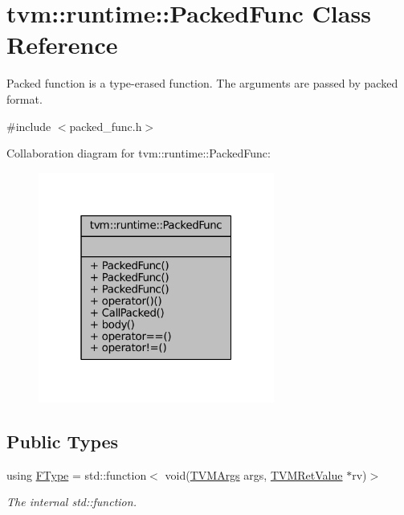 \hypertarget{classtvm_1_1runtime_1_1PackedFunc}{}\section{tvm\+:\+:runtime\+:\+:Packed\+Func Class Reference}
\label{classtvm_1_1runtime_1_1PackedFunc}


Packed function is a type-\/erased function. The arguments are passed by packed format.  




{\ttfamily \#include $<$packed\+\_\+func.\+h$>$}



Collaboration diagram for tvm\+:\+:runtime\+:\+:Packed\+Func\+:
\nopagebreak
\begin{figure}[H]
\begin{center}
\leavevmode
\includegraphics[width=220pt]{classtvm_1_1runtime_1_1PackedFunc__coll__graph}
\end{center}
\end{figure}
\subsection*{Public Types}
\begin{DoxyCompactItemize}
\item 
using \hyperlink{classtvm_1_1runtime_1_1PackedFunc_ae5f951a6a515f3e3a7493c27704b7849}{F\+Type} = std\+::function$<$ void(\hyperlink{classtvm_1_1runtime_1_1TVMArgs}{T\+V\+M\+Args} args, \hyperlink{classtvm_1_1runtime_1_1TVMRetValue}{T\+V\+M\+Ret\+Value} $\ast$rv)$>$
\begin{DoxyCompactList}\small\item\em The internal std\+::function. \end{DoxyCompactList}\end{DoxyCompactItemize}
